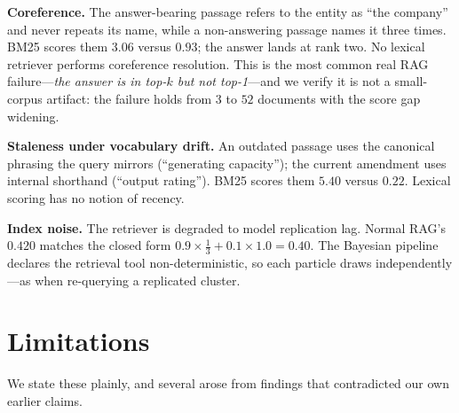 \documentclass[11pt,a4paper]{article}
\begin{document}
\textbf{Coreference.} The answer-bearing passage refers to the entity as
``the company'' and never repeats its name, while a non-answering passage names
it three times. BM25 scores them $3.06$ versus $0.93$; the answer lands at rank
two. No lexical retriever performs coreference resolution. This is the most
common real RAG failure---\emph{the answer is in top-$k$ but not top-1}---and we
verify it is not a small-corpus artifact: the failure holds from $3$ to $52$
documents with the score gap widening.

\textbf{Staleness under vocabulary drift.} An outdated passage uses the
canonical phrasing the query mirrors (``generating capacity''); the current
amendment uses internal shorthand (``output rating''). BM25 scores them $5.40$
versus $0.22$. Lexical scoring has no notion of recency.

\textbf{Index noise.} The retriever is degraded to model replication lag.
Normal RAG's $0.420$ matches the closed form
$0.9 \times \tfrac{1}{3} + 0.1 \times 1.0 = 0.40$. The Bayesian pipeline
declares the retrieval tool non-deterministic, so each particle draws
independently---as when re-querying a replicated cluster.

\section{Limitations}
\label{sec:limitations}

We state these plainly, and several arose from findings that contradicted our
own earlier claims.
\end{document}
